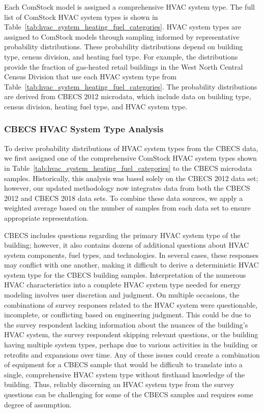 Each ComStock model is assigned a comprehensive HVAC system type. The full list of ComStock HVAC system types is shown in Table~\ref{tab:hvac_system_heating_fuel_categories}. HVAC system types are assigned to ComStock models through sampling informed by representative probability distributions. These probability distributions depend on building type, census division, and heating fuel type. For example, the distributions provide the fraction of gas-heated retail buildings in the West North Central Census Division that use each HVAC system type from Table~\ref{tab:hvac_system_heating_fuel_categories}. The probability distributions are derived from CBECS 2012 microdata, which include data on building type, census division, heating fuel type, and HVAC system type.



\subsubsection{CBECS HVAC System Type Analysis}

To derive probability distributions of HVAC system types from the CBECS data, we first assigned one of the comprehensive ComStock HVAC system types shown in Table~\ref{tab:hvac_system_heating_fuel_categories} to the CBECS microdata samples. Historically, this analysis was based solely on the CBECS 2012 data set; however, our updated methodology now integrates data from both the CBECS 2012 and CBECS 2018 data sets. To combine these data sources, we apply a weighted average based on the number of samples from each data set to ensure appropriate representation.

CBECS includes questions regarding the primary HVAC system type of the building; however, it also contains dozens of additional questions about HVAC system components, fuel types, and technologies. In several cases, these responses may conflict with one another, making it difficult to derive a deterministic HVAC system type for the CBECS building samples. Interpretation of the numerous HVAC characteristics into a complete HVAC system type needed for energy modeling involves user discretion and judgment. On multiple occasions, the combinations of survey responses related to the HVAC system were questionable, incomplete, or conflicting based on engineering judgment. This could be due to the survey respondent lacking information about the nuances of the building's HVAC system, the survey respondent skipping relevant questions, or the building having multiple system types, perhaps due to various activities in the building or retrofits and expansions over time. Any of these issues could create a combination of equipment for a CBECS sample that would be difficult to translate into a single, comprehensive HVAC system type without firsthand knowledge of the building. Thus, reliably discerning an HVAC system type from the survey questions can be challenging for some of the CBECS samples and requires some degree of assumption.

